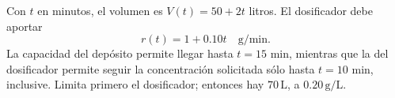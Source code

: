 Con \(t\) en minutos, el volumen es \(V(t)=50+2t\) litros. El dosificador debe aportar
\[
r(t)=1+0.10t\quad\mathrm{g/min}.
\]
La capacidad del depósito permite llegar hasta \(t=15\) min, mientras que la del dosificador permite seguir la concentración solicitada sólo hasta \(t=10\) min, inclusive. Limita primero el dosificador; entonces hay \(70\,\mathrm L\), a \(0.20\,\mathrm{g/L}\).
